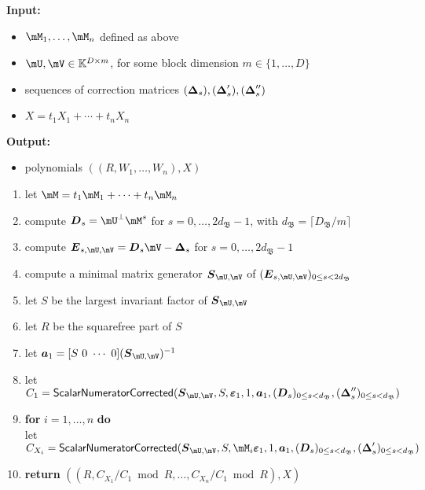 \documentclass[12pt]{article}
\newcommand{\mat}[1]{\bm{\MakeUppercase{#1}}} %
\newcommand{\row}[1]{\bm{\MakeLowercase{#1}}} %
\newcommand{\col}[1]{\bm{\MakeLowercase{#1}}} %
\newcommand{\mainalgoname}{\mathsf{ BlockParametrization}}
\newcommand{\lf}{X}
\begin{document}
\begin{algorithm}[H]
	\caption{$\mainalgoname{\sf Residual}(\mM_1,\dots,\mM_n,\mU,\mV,(\mat{\Delta}_s),(\mat{\Delta}'_s),(\mat{\Delta}''_s),\lf)$}
	{\bf Input:} \vspace{-0.5em}
	\begin{itemize}
	\item $\mM_1,\dots,\mM_n$ defined as above
	\item  $\mU,\mV \in \mathbb{K}^{D \times m}$, for some block dimension  $m \in \{1,\dots,D\}$
        \item sequences of correction matrices $(\mat{\Delta}_s),(\mat{\Delta}'_s),(\mat{\Delta}''_s)$
        \item $\lf =t_1 X_1 + \cdots + t_n X_n$
	\end{itemize}
	    {\bf Output:}  \vspace{-0.5em}
        \begin{itemize}
        \item  polynomials $((R,W_1,\dots,W_n),\lf)$
        \end{itemize}
  \begin{enumerate}
  \item\label{residualstep1}   let $\mM = t_1 \mM_1 + \cdots + t_n \mM_n$
  \item\label{residualstep3} { compute $\mat{D}_s = \mU^{\perp}\mM^s$ for $s=0,\dots,2d_\mathfrak{B}-1$, with $d_\mathfrak{B} = \lceil D_\mathfrak{B}/m \rceil$}
  \item\label{residualstep4} { compute $\mat{E}_{s,\mU,\mV}= \mat{D}_s\mV-\mat{\Delta}_s$ for $s=0,\dots, 2d_\mathfrak{B}-1$}
  \item\label{residualstep5} { compute a minimal matrix generator $\mat{S}_{\mU,\mV}$ of $(\mat{E}_{s,\mU,\mV})_{0 \le s < 2d_\mathfrak{B}}$}
  \item\label{residualstep6} { let $S$ be the largest invariant factor of $\mat{S}_{\mU,\mV}$}
  \item\label{residualstep7} { let $R$ be  the squarefree part  of $S$}
  \item\label{residualstep8} { let $\row{a}_1 = [S~0 ~\cdots~ 0] (\mat{S}_{\mU,\mV})^{-1}$}
  \item\label{residualstep9}  let $C_1 = \mathsf{{\sf ScalarNumeratorCorrected}}(\mat{S}_{\mU,\mV}, S, \col{\varepsilon}_1, 1, \row{a}_1,  (\mat{D}_s)_{0 \le s < d_\mathfrak{B}}, (\mat{\Delta}''_s)_{0 \le s < d_\mathfrak{B}})$
  \item\label{residualstep10} \textbf{for} $i=1,\dots,n$ \textbf{do} \\
    \phantom{for}let $C_{X_i} = \mathsf{{\sf ScalarNumeratorCorrected}}(\mat{S}_{\mU,\mV},S, \mM_i\col{\varepsilon}_1, 1, \row{a}_1, (\mat{D}_s)_{0 \le s < d_\mathfrak{B}}, (\mat{\Delta}'_s)_{0 \le s < d_\mathfrak{B}})$
\item\label{residualstep11}     \textbf{return} $((R, C_{X_1}/ C_1 \bmod R, \dots, C_{X_n}/ C_{1} \bmod R),\lf)$
  \end{enumerate}  \label{algo:block-sparse-fglm-residual}
\end{algorithm}
\end{document}
